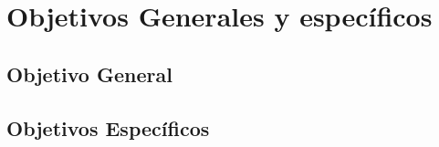\chapter{Objetivos Generales y espec\'ificos}
\label{sec:objetivos}

\section{Objetivo General}

\section{Objetivos Espec\'ificos}


\pagebreak